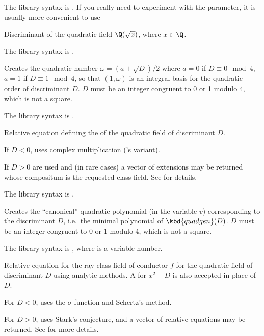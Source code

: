 The library syntax is .
If you really need to experiment with the  parameter, it is
usually more convenient to use

\label{se:quaddisc}
Discriminant of the quadratic field $\Q(\sqrt{x})$, where $x\in\Q$.

The library syntax is .

\label{se:quadgen}
Creates the quadratic
number $\omega=(a+\sqrt{D})/2$ where $a=0$ if $D\equiv0\mod4$,
$a=1$ if $D\equiv1\mod4$, so that $(1,\omega)$ is an integral basis for the
quadratic order of discriminant $D$. $D$ must be an integer congruent to 0 or
1 modulo 4, which is not a square.

The library syntax is .

\label{se:quadhilbert}
Relative equation defining the
 of the quadratic field of discriminant $D$.

If $D < 0$, uses complex multiplication ('s variant).

If $D > 0$  are used and (in rare cases) a
vector of extensions may be returned whose compositum is the requested class
field. See  for details.

The library syntax is .

\label{se:quadpoly}
Creates the ``canonical'' quadratic
polynomial (in the variable $v$) corresponding to the discriminant $D$,
i.e.~the minimal polynomial of $\kbd{quadgen}(D)$. $D$ must be an integer
congruent to 0 or 1 modulo 4, which is not a square.

The library syntax is , where  is a variable number.

\label{se:quadray}
Relative equation for the ray
class field of conductor $f$ for the quadratic field of discriminant $D$
using analytic methods. A  for $x^2 - D$ is also accepted in place
of $D$.

For $D < 0$, uses the $\sigma$ function and Schertz's method.

For $D>0$, uses Stark's conjecture, and a vector of relative equations may be
returned. See  for more details.

